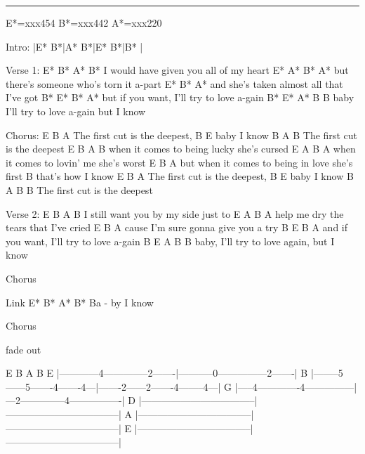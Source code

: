 \noindent\rule{\columnwidth}{1pt}

\begin{multicols}{2}
\begin{lstsong}
E*=xxx454
B*=xxx442
A*=xxx220

Intro: |E*  B*|A*  B*|E*  B*|B*  |

Verse 1:
             E*        B*         A*     B*
I would have given you all of my heart
            E*            A*        B*   A*
but there's someone who's torn it a-part
          E*           B*            A*
and she's taken almost all that I've got
     B*               E*            B*   A*
but if you want, I'll try to love a-gain
B*         E*           A*          B    B
baby I'll try to love a-gain but I know

Chorus:
E            B          A
   The first cut is the deepest,
B       E
baby I know
     B                A       B
The first cut is the deepest
        E              B           A     B
when it comes to being lucky she's cursed
        E               A        B     A
when it comes to lovin' me she's worst
            E                 B           A
but when it comes to being in love she's first
       B
that's how I know
E            B           A
   The first cut is the deepest,
B       E
baby I know
          B           A     B   B
The first cut is the deepest

Verse 2:
        E        B     A    B
I still want you by my side   just to
E               A               B      A
help me dry the tears that I've cried
          E               B     A
cause I'm sure gonna give you a try
     B                E             B     A
and if you want, I'll try to love a-gain
B           E           A            B    B
baby, I'll try to love again, but I know

Chorus

Link
E*  B*  A*   B*
        Ba - by I know

Chorus

fade out
\end{lstsong}
\end{multicols}


\begin{lsttab}


        E             B                   A              B
E |------------4--------------2-------|-----------0---------------2-------|
B |--------5------5-------4-------4---|-------2------2-------4--------4---|
G |-----4-------------4---------------|---2--------------4----------------|
D |-----------------------------------|-----------------------------------|
A |-----------------------------------|-----------------------------------|
E |-----------------------------------|-----------------------------------|
\end{lsttab}
\newpage

